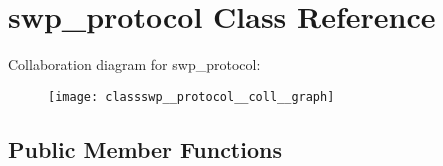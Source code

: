 \hypertarget{classswp__protocol}{}\section{swp\+\_\+protocol Class Reference}
\label{classswp__protocol}


Collaboration diagram for swp\+\_\+protocol\+:\nopagebreak
\begin{figure}[H]
\begin{center}
\leavevmode
\texttt{[image: classswp\_\_protocol\_\_coll\_\_graph]}
\end{center}
\end{figure}
\subsection*{Public Member Functions}
